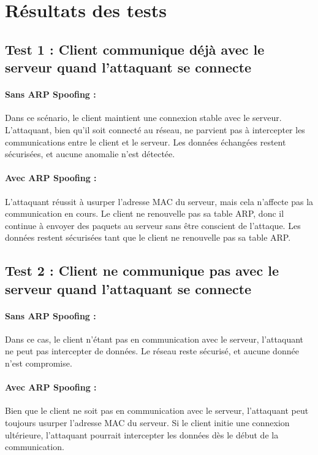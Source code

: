 \documentclass[a4paper,twocolumn]{report}
\begin{document}
\section{Résultats des tests}

\subsection{Test 1 : Client communique déjà avec le serveur quand l'attaquant se connecte}
\paragraph{Sans ARP Spoofing :}

Dans ce scénario, le client maintient une connexion stable avec le serveur.
L'attaquant, bien qu'il soit connecté au réseau, ne parvient pas à intercepter
les communications entre le client et le serveur. Les données échangées restent sécurisées,
et aucune anomalie n'est détectée.

\paragraph{Avec ARP Spoofing :}
L'attaquant réussit à usurper l'adresse MAC du serveur,
mais cela n'affecte pas la communication en cours.
Le client ne renouvelle pas sa table ARP, donc il continue à envoyer des paquets
au serveur sans être conscient de l'attaque. Les données restent sécurisées tant
que le client ne renouvelle pas sa table ARP.

\subsection{Test 2 : Client ne communique pas avec le serveur quand l'attaquant se connecte}
\paragraph{Sans ARP Spoofing :}

Dans ce cas, le client n'étant pas en communication avec le serveur, l'attaquant
ne peut pas intercepter de données. Le réseau reste sécurisé,
et aucune donnée n'est compromise.

\paragraph{Avec ARP Spoofing :}

Bien que le client ne soit pas en communication avec le serveur, l'attaquant peut
toujours usurper l'adresse MAC du serveur. Si le client initie une connexion ultérieure,
l'attaquant pourrait intercepter les données dès le début de la communication.
\end{document}
